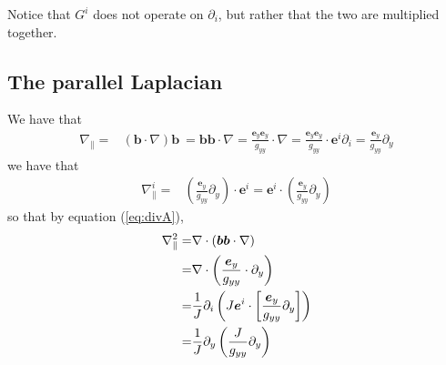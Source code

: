 \documentclass[12pt]{article}
\def\L{\left}
\def\R{\right}
\newcommand{\Grad}{\ensuremath{\nabla}}
\newcommand{\ve}[1]{\ensuremath{\boldsymbol{#1}}}
\newcommand{\Div}[1]{\ensuremath{\nabla\cdot #1 }}
\begin{document}
%
Notice that $G^i$ does not operate on $\partial_i$, but rather that the two are
multiplied together.
%



\subsection{The parallel Laplacian}
%
We have that
%
\begin{align*}
    \Grad_\| =& \L(\ve{b} \cdot \Grad\R) \ve{b}\
             = \ve{b} \ve{b} \cdot \Grad
             = \frac{\ve{e}_y \ve{e}_y}{g_{yy}} \cdot \Grad
             = \frac{\ve{e}_y \ve{e}_y}{g_{yy}} \cdot \ve{e}^i \partial_i
             = \frac{\ve{e}_y}{g_{yy}} \partial_y
\end{align*}
%
we have that
%
\begin{align*}
    \Grad_\|^i =& \L(\frac{\ve{e}_y}{g_{yy}} \partial_y\R)\cdot \ve{e}^i
               = \ve{e}^i \cdot \L(\frac{\ve{e}_y}{g_{yy}} \partial_y\R)
\end{align*}
%
so that by equation (\ref{eq:divA}),
%
\begin{align*}
    \Grad_\|^2 =& \Div\L(\ve{b} \ve{b} \cdot \Grad\R)\\
               =& \Div\L(\frac{\ve{e}_y}{g_{yy}} \cdot \partial_y\R)\\
               =& \frac{1}{J} \partial_i \L(
		      J\ve{e}^i \cdot \L[\frac{\ve{e}_y}{g_{yy}} \partial_y\R]
		  \R)\\
               =& \frac{1}{J} \partial_y \L(\frac{J}{g_{yy}} \partial_y\R)
\end{align*}
%
\end{document}
